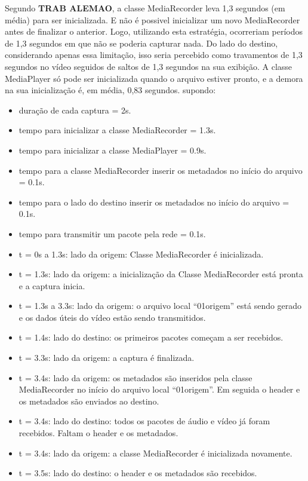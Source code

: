 \documentclass{acm_proc_article-sp}
\newcommand{\todo}[1]{\textcolor[rgb]{1.00,0.00,0.00}{\bf \uppercase{#1}}}
\begin{document}
Segundo \todo{trab alemao}, a classe MediaRecorder leva 1,3 segundos (em média) para ser inicializada. E não é possivel inicializar um novo MediaRecorder antes de finalizar o anterior. Logo, utilizando esta estratégia, ocorreriam períodos de 1,3 segundos em que não se poderia capturar nada. Do lado do destino, considerando apenas essa limitação, isso seria percebido como travamentos de 1,3 segundos no vídeo seguidos de saltos de 1,3 segundos na sua exibição. A classe MediaPlayer só pode ser inicializada quando o arquivo estiver pronto, e a demora na sua inicialização é, em média, 0,83 segundos.
supondo:

\begin{itemize}
 \item duração de cada captura = 2s.
 \item tempo para inicializar a classe MediaRecorder = 1.3s.
 \item tempo para inicializar a classe MediaPlayer = 0.9s.
 \item tempo para a classe MediaRecorder inserir os metadados no início do arquivo = 0.1s.
 \item tempo para o lado do destino inserir os metadados no início do arquivo = 0.1s.
 \item tempo para transmitir um pacote pela rede = 0.1s.
 \item t = 0s a 1.3s: lado da origem: Classe MediaRecorder é inicializada.
 \item t = 1.3s: lado da origem: a inicialização da Classe MediaRecorder está pronta e a captura inicia.
 \item t = 1.3s a 3.3s: lado da origem: o arquivo local “01origem” está sendo gerado e os dados úteis do vídeo estão sendo transmitidos.
 \item t = 1.4s: lado do destino: os primeiros pacotes começam a ser recebidos.
 \item t = 3.3s: lado da origem: a captura é finalizada.
 \item t = 3.4s: lado da origem: os metadados são inseridos pela classe MediaRecorder no início do arquivo local “01origem”. Em seguida o header e os metadados são enviados ao destino.
 \item t = 3.4s: lado do destino: todos os pacotes de áudio e vídeo já foram recebidos. Faltam o header e os metadados.
 \item t = 3.4s: lado da origem: a classe MediaRecorder é inicializada novamente.
 \item t = 3.5s: lado do destino: o header e os metadados são recebidos.

\end{itemize}
\end{document}
